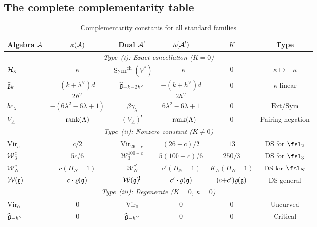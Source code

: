 %
%

\subsection{The complete complementarity table}
\label{subsec:thqg-IV-complementarity-table}

\begin{table}[ht]
\centering
\caption{Complementarity constants for all standard families}
\label{tab:thqg-IV-complementarity}
\renewcommand{\arraystretch}{1.6}
{\small
\begin{tabular}{|l|c|c|c|c|c|}
\hline
\textbf{Algebra $\mathcal{A}$} & $\kappa(\mathcal{A})$ & \textbf{Dual $\mathcal{A}^!$} &
$\kappa(\mathcal{A}^!)$ & $K$ & \textbf{Type} \\
\hline
\multicolumn{6}{|c|}{\textit{Type~(i): Exact cancellation ($K = 0$)}} \\
\hline
$\mathcal{H}_\kappa$ & $\kappa$ & $\operatorname{Sym}^{\mathrm{ch}}(V^*)$ & $-\kappa$ & $0$ &
$\kappa \mapsto -\kappa$ \\
\hline
$\widehat{\mathfrak{g}}_k$ &
$\dfrac{(k+h^\vee)d}{2h^\vee}$ &
$\widehat{\mathfrak{g}}_{-k-2h^\vee}$ &
$\dfrac{-(k+h^\vee)d}{2h^\vee}$ & $0$ & $\kappa$ linear \\
\hline
$bc_\lambda$ & $-(6\lambda^2 - 6\lambda + 1)$ &
$\beta\gamma_\lambda$ & $6\lambda^2 - 6\lambda + 1$ & $0$ &
$\mathrm{Ext}/\mathrm{Sym}$ \\
\hline
$V_\Lambda$ & $\operatorname{rank}(\Lambda)$ &
$(V_\Lambda)^!$ & $-\operatorname{rank}(\Lambda)$ & $0$ & Pairing negation \\
\hline
\multicolumn{6}{|c|}{\textit{Type~(ii): Nonzero constant ($K \neq 0$)}} \\
\hline
$\mathrm{Vir}_c$ & $c/2$ & $\mathrm{Vir}_{26-c}$ &
$(26{-}c)/2$ & $13$ & DS for $\fsl_2$ \\
\hline
$\mathcal{W}_3^c$ & $5c/6$ & $\mathcal{W}_3^{100-c}$ &
$5(100{-}c)/6$ & $250/3$ & DS for $\fsl_3$ \\
\hline
$\mathcal{W}_N^c$ & $c(H_N{-}1)$ & $\mathcal{W}_N^{c'}$ &
$c'(H_N{-}1)$ & $K_N(H_N{-}1)$ & DS for $\fsl_N$ \\
\hline
$\mathcal{W}(\mathfrak{g})$ & $c \cdot \varrho(\mathfrak{g})$ &
$\mathcal{W}(\mathfrak{g})^!$ & $c' \cdot \varrho(\mathfrak{g})$ &
$(c{+}c')\varrho(\mathfrak{g})$ & DS general \\
\hline
\multicolumn{6}{|c|}{\textit{Type~(iii): Degenerate ($K = 0$, $\kappa = 0$)}} \\
\hline
$\mathrm{Vir}_0$ & $0$ & $\mathrm{Vir}_0$ & $0$ & $0$ & Uncurved \\
\hline
$\widehat{\mathfrak{g}}_{-h^\vee}$ & $0$ & $\widehat{\mathfrak{g}}_{-h^\vee}$ & $0$ &
$0$ & Critical \\
\hline
\end{tabular}
}
\end{table}


